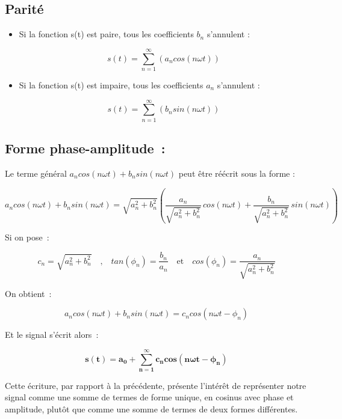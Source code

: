 \subsection*{Parité}

\begin{itemize}
\item Si la fonction s(t) est paire, tous les coefficients $b_n$ s'annulent :

$$ s(t) = \sum_{n=1}^{\infty} \left(a_ncos\left( n\omega t\right) \right) $$

\item Si la fonction s(t) est impaire, tous les coefficients $a_n$ s'annulent :

$$ s(t) = \sum_{n=1}^{\infty} \left(b_nsin\left(n \omega t\right) \right) $$

\end{itemize}

\subsection*{Forme phase-amplitude~:}

Le terme général $a_n cos( n \omega t ) + b_n sin( n \omega t )$ peut être réécrit sous la forme : 

$$ a_ncos(n\omega t)+b_nsin(n\omega t) = \sqrt{a_n^2+b_n^2}\left(\dfrac{a_n}{\sqrt{a_n^2+b_n^2}}\,cos(n\omega t) + \dfrac{b_n}{\sqrt{a_n^2+b_n^2}}\,sin(n\omega t)\right)$$

Si on pose~:

$$c_n = \sqrt{a_n^2+b_n^2} \quad\text{,}\quad tan(\phi_n) = \dfrac{b_n}{a_n} \quad\text{et}\quad cos(\phi_n)= \dfrac{a_n}{\sqrt{a_n^2+b_n^2}}$$

On obtient~:

$$ a_ncos(n\omega t)+b_nsin(n\omega t) = c_n cos( n \omega t - \phi_n ) $$ 

Et le signal s'écrit alors~:

\begin{equation}
\bm{s(t)= a_0 + \sum_{n=1}^{\infty} c_n cos( n \omega t - \phi_n )} 
\end{equation}

Cette écriture, par rapport à la précédente, présente l'intérêt de représenter notre signal comme une somme de termes de forme unique, en cosinus avec phase et amplitude, plutôt que comme une somme de termes de deux formes différentes. \\

